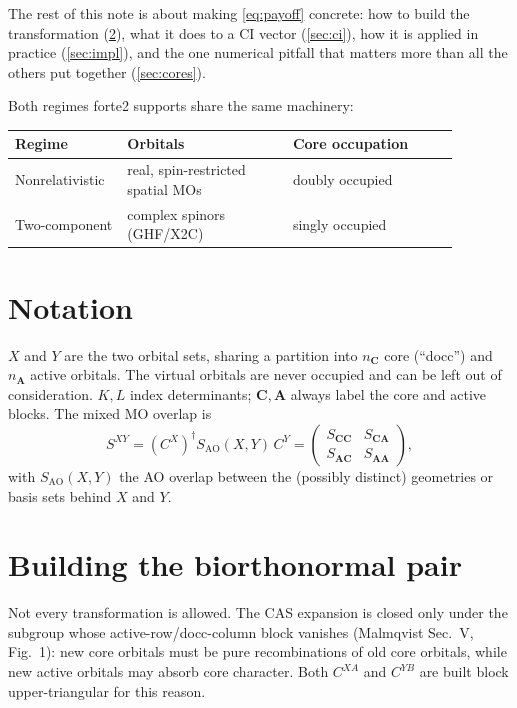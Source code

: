 \documentclass[aip,jcp,preprint]{revtex4-1}
\begin{document}
The rest of this note is about making \cref{eq:payoff} concrete: how to build
the transformation (\cref{sec:biorth}), what it does to a CI vector
(\cref{sec:ci}), how it is applied in practice (\cref{sec:impl}), and the one
numerical pitfall that matters more than all the others put together
(\cref{sec:cores}).

Both regimes forte2 supports share the same machinery:
\begin{center}
\begin{tabular}{@{}p{0.20\linewidth}p{0.34\linewidth}p{0.34\linewidth}@{}}
\toprule
Regime & Orbitals & Core occupation \\
\midrule
Nonrelativistic & real, spin-restricted spatial MOs & doubly occupied \\
Two-component & complex spinors (GHF/X2C) & singly occupied \\
\bottomrule
\end{tabular}
\end{center}

\section{Notation}

$X$ and $Y$ are the two orbital sets, sharing a partition into $n_{\mathbf{C}}$ core
(``docc'') and $n_{\mathbf{A}}$ active orbitals.
The virtual orbitals are never occupied and can be left out of consideration.
$K,L$ index determinants; $\mathbf{C},\mathbf{A}$ always label the core and active blocks. The
mixed MO overlap is
\begin{equation}
 S^{XY} = (C^X)^\dagger S_\mathrm{AO}(X,Y)\, C^Y
 = \begin{pmatrix} S_{\mathbf{C}\mathbf{C}} & S_{\mathbf{C}\mathbf{A}} \\ S_{\mathbf{A}\mathbf{C}} & S_{\mathbf{A}\mathbf{A}} \end{pmatrix},
 \label{eq:mixed-overlap}
\end{equation}
with $S_\mathrm{AO}(X,Y)$ the AO overlap between the (possibly distinct)
geometries or basis sets behind $X$ and $Y$.

\section{Building the biorthonormal pair}
\label{sec:biorth}

Not every transformation is allowed. The CAS expansion is closed only under
the subgroup whose active-row/docc-column block vanishes (Malmqvist Sec.~V,
Fig.~1): new core orbitals must be pure recombinations of old core
orbitals, while new active orbitals may absorb core character. Both
$C^{XA}$ and $C^{YB}$ are built block upper-triangular for this reason.
\end{document}
